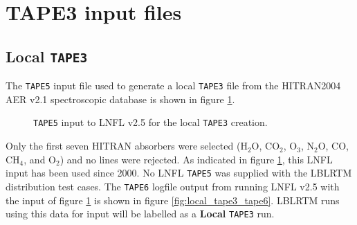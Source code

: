 \section{TAPE3 input files}
\label{sec:local_tape3}
\subsection{Local \texttt{TAPE3}}
The \texttt{TAPE5} input file used to generate a local \texttt{TAPE3} file from the HITRAN2004 AER v2.1 spectroscopic database is shown in figure \ref{fig:local_tape3_tape5}.

\begin{figure}[htp]
  \centering
  \caption{\texttt{TAPE5} input to LNFL v2.5 for the local \texttt{TAPE3} creation.}
  \label{fig:local_tape3_tape5}
\end{figure}

Only the first seven HITRAN absorbers were selected (H$_2$O, CO$_2$, O$_3$, N$_2$O, CO, CH$_4$, and O$_2$) and no lines were rejected. As indicated in figure \ref{fig:local_tape3_tape5}, this LNFL input has been used since 2000. No LNFL \texttt{TAPE5} was supplied with the LBLRTM distribution test cases. The \texttt{TAPE6} logfile output from running LNFL v2.5 with the input of figure \ref{fig:local_tape3_tape5} is shown in figure \ref{fig:local_tape3_tape6}. LBLRTM runs using this data for input will be labelled as a \textbf{Local} \texttt{TAPE3} run.

